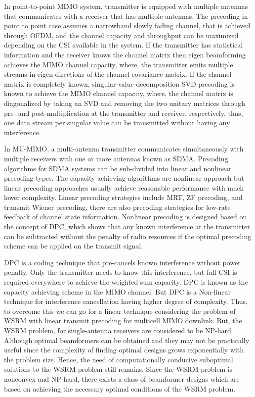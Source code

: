 \documentclass[a4paper, 12pt,titlepage]{dithesis} %
\begin{document}
In point-to-point \ac{MIMO} system, transmitter is equipped with multiple antennas that communicates with a receiver that has multiple antennas. The precoding in point to point case assumes a narrowband slowly fading channel, that is achieved through \ac{OFDM}, and the channel capacity and throughput can be maximized depending on the \ac{CSI} available in the system. If the transmitter has statistical information and the receiver knows the channel matrix then eigen beamforming achieves the \ac{MIMO} channel capacity, where, the transmitter emits multiple streams in eigen directions of the channel covariance matrix. If the channel matrix is completely known, singular-value-decomposition \ac{SVD} precoding is known to achieve the \ac{MIMO} channel capacity, where, the channel matrix is diagonalized by taking an \ac{SVD} and removing the two unitary matrices through pre- and post-multiplication at the transmitter and receiver, respectively, thus, one data stream per singular value can be transmitted without having any interference.

In \ac{MU-MIMO}, a multi-antenna transmitter communicates simultaneously with multiple receivers with one or more antennas known as \ac{SDMA}. Precoding algorithms for \ac{SDMA} systems can be sub-divided into linear and nonlinear precoding types. The capacity achieving algorithms are nonlinear approach but linear precoding approaches usually achieve reasonable performance with much lower complexity. Linear precoding strategies include \ac{MRT},  \ac{ZF} precoding, and transmit Wiener precoding, there are also precoding strategies for low-rate feedback of channel state information. Nonlinear precoding is designed based on the concept of \ac{DPC}, which shows that any known interference at the transmitter can be subtracted without the penalty of radio resources if the optimal precoding scheme can be applied on the transmit signal.

\ac{DPC} is a coding technique that pre-cancels known interference without power penalty. Only the transmitter needs to know this  interference, but full \ac{CSI} is required everywhere to achieve the weighted sum capacity. \ac{DPC} is known as the capacity achieving scheme in the \ac{MIMO} channel. But \ac{DPC} is a Non-linear technique for interference cancellation having higher degree of complexity. Thus, to overcome this we can go for a linear technique considering the problem of  \ac{WSRM} with linear transmit precoding for multicell  \ac{MIMO} downlink. But, the \ac{WSRM} problem, for single-antenna receivers are considered to be NP-hard. Although 
optimal beamformers can be obtained and they may not be practically useful since the complexity of finding optimal designs grows exponentially with the problem size. Hence, the need of computationally conducive suboptimal solutions to the WSRM problem 
still remains. Since the \ac{WSRM} problem is nonconvex and NP-hard, there exists a class of beamformer designs which 
are based on achieving the necessary optimal conditions of the \ac{WSRM} problem.
\end{document}
